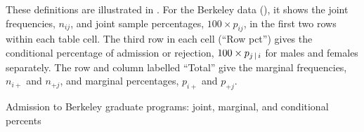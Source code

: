 These definitions are illustrated in .
For the Berkeley data (), it shows the joint frequencies, $n_{ij}$, and joint sample percentages,
$100 \times p_{ij}$, in the first two rows within each table cell.
The third row in each cell (``Row pct'')
gives the conditional percentage of admission or rejection,
$100 \times p_{j\, | \, i}$ for males and females separately.
The row and column labelled ``Total'' give the
marginal frequencies, $n_{i+}$ and $n_{+j}$,
and marginal percentages, $p_{i+}$ and $p_{+j}$.

\begin{Output}[htb]
\caption{Admission to Berkeley graduate programs: joint, marginal, and conditional percents}\label{out:berkfreq.1}
\small

\end{Output}







%







